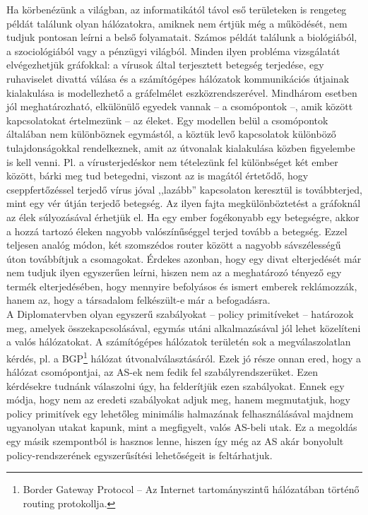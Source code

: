 Ha körbenézünk a világban, az informatikától távol eső területeken is rengeteg példát találunk olyan hálózatokra, amiknek nem értjük még a működését, nem tudjuk pontosan leírni a belső folyamatait. Számos példát találunk a biológiából, a szociológiából vagy a pénzügyi világból. Minden ilyen probléma vizsgálatát elvégezhetjük gráfokkal: a vírusok által terjesztett betegség terjedése, egy ruhaviselet divattá válása és a számítógépes hálózatok kommunikációs útjainak kialakulása is modellezhető a gráfelmélet eszközrendszerével. Mindhárom esetben jól meghatározható, elkülönülő egyedek vannak -- a csomópontok --, amik között kapcsolatokat értelmezünk -- az éleket. Egy modellen belül a csomópontok általában nem különböznek egymástól, a köztük levő kapcsolatok különböző tulajdonságokkal rendelkeznek, amit az útvonalak kialakulása közben figyelembe is kell venni. Pl. a vírusterjedéskor nem tételezünk fel különbséget két ember között, bárki meg tud betegedni, viszont az is magától értetődő, hogy cseppfertőzéssel terjedő vírus jóval ,,lazább'' kapcsolaton keresztül is továbbterjed, mint egy vér útján terjedő betegség. Az ilyen fajta megkülönböztetést a gráfoknál az élek súlyozásával érhetjük el. Ha egy ember fogékonyabb egy betegségre, akkor a hozzá tartozó éleken nagyobb valószínűséggel terjed tovább a betegség. Ezzel teljesen analóg módon, két szomszédos router között a nagyobb sávszélességű úton továbbítjuk a csomagokat. Érdekes azonban, hogy egy divat elterjedését már nem tudjuk ilyen egyszerűen leírni, hiszen nem az a meghatározó tényező egy termék elterjedésében, hogy mennyire befolyásos és ismert emberek reklámozzák, hanem az, hogy a társadalom felkészült-e már a befogadásra\cite{DuncanWatts, DobreiMScOnlab1}.\\

A Diplomatervben olyan egyszerű szabályokat -- policy primitíveket -- határozok meg, amelyek összekapcsolásával, egymás utáni alkalmazásával jól lehet közelíteni a valós hálózatokat. A számítógépes hálózatok területén sok a megválaszolatlan kérdés, pl. a BGP\footnote{Border Gateway Protocol -- Az Internet tartományszintű hálózatában történő routing protokollja.} hálózat útvonalválasztásáról. Ezek jó része onnan ered, hogy a hálózat csomópontjai, az AS-ek nem fedik fel szabályrendszerüket. Ezen kérdésekre tudnánk válaszolni úgy, ha felderítjük ezen szabályokat. Ennek egy módja, hogy nem az eredeti szabályokat adjuk meg, hanem megmutatjuk, hogy policy primitívek egy lehetőleg minimális halmazának felhasználásával majdnem ugyanolyan utakat kapunk, mint a megfigyelt, valós AS-beli utak. Ez a megoldás egy másik szempontból is hasznos lenne, hiszen így még az AS akár bonyolult policy-rendszerének egyszerűsítési lehetőségeit is feltárhatjuk.\\

